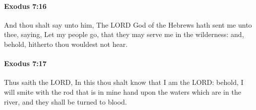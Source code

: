 		\paragraph{Exodus 7:16} %
			\label{EXODUS-7-16}

			And thou shalt say unto him, The LORD God of the Hebrews hath sent me unto thee, saying, Let my people go, that they may serve me in the wilderness: and, behold, hitherto thou wouldest not hear.


		\paragraph{Exodus 7:17} %
			\label{EXODUS-7-17}

			Thus saith the LORD, In this thou shalt know that I am the LORD: behold, I will smite with the rod that is in mine hand upon the waters which are in the river, and they shall be turned to blood.

